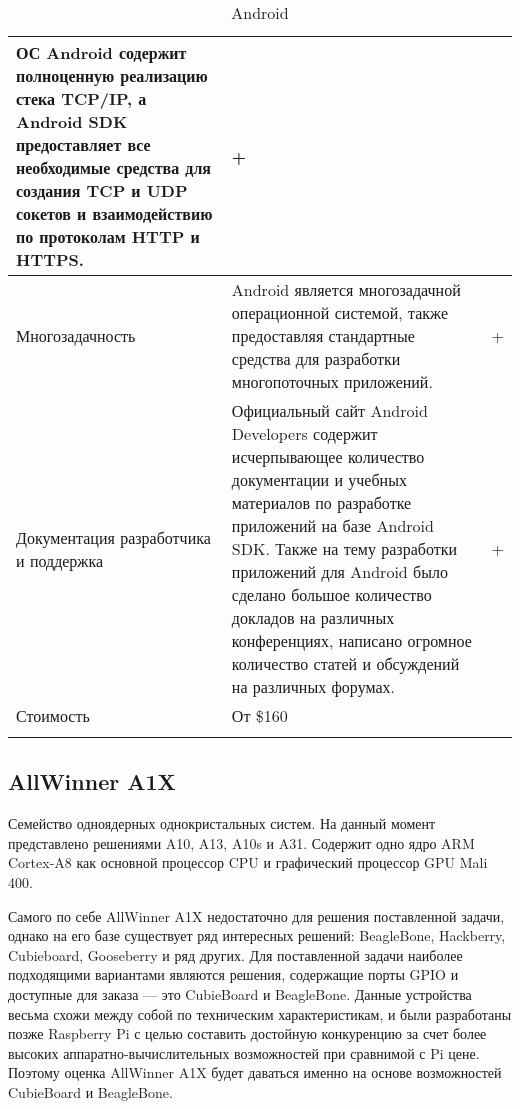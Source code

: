 \documentclass[twoside,a4paper]{msmb} %
\begin{document}
\begin{longtable}{| p{} | p{} | c |}
ОС Android содержит полноценную реализацию стека TCP/IP, а Android SDK предоставляет все необходимые средства для создания TCP и UDP сокетов и взаимодействию по протоколам HTTP и HTTPS\cite{AndroidNetwork}. &

+\\

\hline
Многозадачность &

Android является многозадачной операционной системой, также предоставляя стандартные средства для разработки многопоточных приложений\cite{AndroidThreading}. &

+\\

\hline 
Документация разработчика и поддержка & 

Официальный сайт Android Developers содержит исчерпывающее количество документации и учебных материалов по разработке приложений на базе Android SDK. Также на тему разработки приложений для Android было сделано большое количество докладов на различных конференциях, написано огромное количество статей и обсуждений на различных форумах. &

+\\

\hline

Стоимость &

От \$160 \cite{AndroidBuy}&

\\

\hline
\caption{Android} %
\end{longtable}
\egroup

\subsection{AllWinner A1X}
Семейство одноядерных однокристальных систем. На данный момент представлено решениями A10, A13, A10s и A31. Содержит одно ядро ARM Cortex-A8 как основной процессор CPU и графический процессор GPU Mali 400\cite{AllWinner}.

Самого по себе AllWinner A1X недостаточно для решения поставленной задачи, однако на его базе существует ряд интересных решений: BeagleBone\cite{BeagleBone}, Hackberry\cite{Hackberry}, Cubieboard\cite{Cubieboard}, Gooseberry\cite{Gooseberry} и ряд других. Для поставленной задачи наиболее подходящими вариантами являются решения, содержащие порты GPIO и доступные для заказа --- это CubieBoard и BeagleBone. Данные устройства весьма схожи между собой по техническим характеристикам, и были разработаны позже Raspberry Pi с целью составить достойную конкуренцию за счет более высоких аппаратно-вычислительных возможностей при сравнимой с Pi цене. Поэтому оценка AllWinner A1X будет даваться именно на основе возможностей CubieBoard и BeagleBone.
\end{document}
